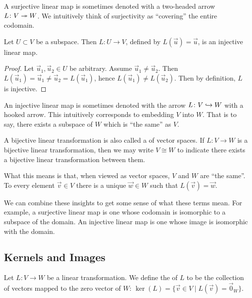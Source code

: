 A surjective linear map is sometimes denoted with a two-headed arrow
$L\colon V\twoheadrightarrow W$. We intuitively think of surjectivity as ``covering''
the entire codomain.

\begin{example}
Let $U\subset V$ be a subspace. Then $L\colon U\to V$, defined by $L(\vec{u})=\vec{u}$,
is an injective linear map.

\begin{proof}
Let $\vec{u}_{1},\vec{u}_{2}\in U$ be arbitrary. Assume $\vec{u}_{1}\neq\vec{u}_{2}$.
Then $L(\vec{u}_{1})=\vec{u}_{1}\neq\vec{u}_{2}=L(\vec{u}_{1})$, hence
$L(\vec{u}_{1})\neq L(\vec{u}_{2})$. Then by definition, $L$ is injective.
\end{proof}
\end{example}

An injective linear map is sometimes denoted with the arrow $L\colon V\hookrightarrow W$
with a hooked arrow. This intuitively corresponds to embedding $V$ into $W$.
That is to say, there exists a subspace of $W$ which is ``the same'' as
$V$.

A bijective linear transformation is also called a 
of vector spaces. If $L\colon V\to W$ is a bijective linear
transformation, then we may write $V\cong W$ to indicate there exists a
bijective linear transformation between them.

What this means is that, when viewed as vector spaces, $V$ and $W$ are
``the same''. To every element $\vec{v}\in V$ there is a unique
$\vec{w}\in W$ such that $L(\vec{v})=\vec{w}$.

We can combine these insights to get some sense of what these terms
mean. For example, a surjective linear map is one whose codomain is
isomorphic to a subspace of the domain. An injective linear map is one
whose image is isomorphic with the domain.

\subsection{Kernels and Images}

\begin{definition}
Let $L\colon V\to W$ be a linear transformation. We define the
 of $L$ to be the collection of vectors mapped to the
zero vector of $W$: $\ker(L)=\{\vec{v}\in V\mid L(\vec{v})=\vec{0}_{W}\}$.
\end{definition}

